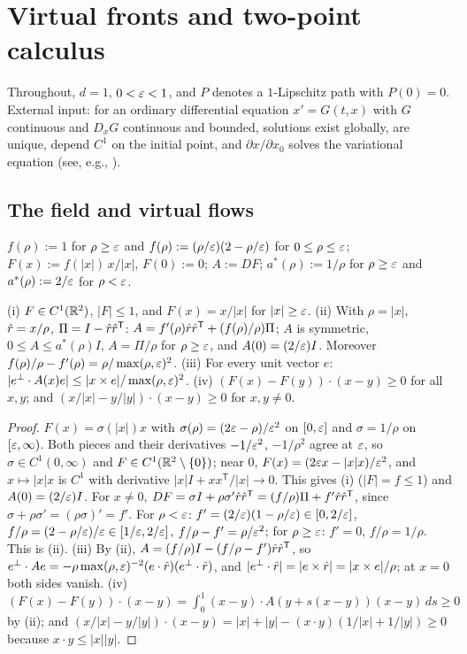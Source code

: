 \section{Virtual fronts and two-point calculus}\label{sec:prelim}

Throughout, $d=1$, $0<\varepsilon<1$, and $P$ denotes a $1$-Lipschitz path with $P(0)=0$. External input: for an ordinary
differential equation $x'=G(t,x)$ with $G$ continuous and $D_xG$ continuous and bounded, solutions exist globally, are unique,
depend $C^1$ on the initial point, and $\partial x/\partial x_0$ solves the variational equation (see, e.g.,
\cite[Ch.~V]{Hartman}).

\subsection{The field and virtual flows}

\begin{definition}\label{def:field}
$f(\rho):=1$ for $\rho\ge\varepsilon$ and $f(\rho):=(\rho/\varepsilon)(2-\rho/\varepsilon)$ for $0\le\rho\le\varepsilon$; $F(x):=f(|x|)\,x/|x|$, $F(0):=0$;
$A:=DF$; $a^*(\rho):=1/\rho$ for $\rho\ge\varepsilon$ and $a^*(\rho):=2/\varepsilon$ for $\rho<\varepsilon$.
\end{definition}

\begin{lemma}\label{lem:field}
\textup{(i)} $F\in C^1(\mathbb{R}^2)$, $|F|\le1$, and $F(x)=x/|x|$ for $|x|\ge\varepsilon$.
\textup{(ii)} With $\rho=|x|$, $\hat r=x/\rho$, $\Pi=I-\hat r\hat r^{\mathsf T}$: $A=f'(\rho)\hat r\hat r^{\mathsf T}+(f(\rho)/\rho)\Pi$;
$A$ is symmetric, $0\le A\le a^*(\rho)I$, $A=\Pi/\rho$ for $\rho\ge\varepsilon$, and $A(0)=(2/\varepsilon)I$. Moreover
$f(\rho)/\rho-f'(\rho)=\rho/\max(\rho,\varepsilon)^2$.
\textup{(iii)} For every unit vector $e$: $|e^\perp\cdot A(x)e|\le|x\times e|/\max(\rho,\varepsilon)^2$.
\textup{(iv)} $(F(x)-F(y))\cdot(x-y)\ge0$ for all $x,y$; and $(x/|x|-y/|y|)\cdot(x-y)\ge0$ for $x,y\ne0$.
\end{lemma}

\begin{proof}
$F(x)=\sigma(|x|)x$ with $\sigma(\rho)=(2\varepsilon-\rho)/\varepsilon^2$ on $[0,\varepsilon]$ and $\sigma=1/\rho$ on $[\varepsilon,\infty)$. Both pieces and
their derivatives $-1/\varepsilon^2$, $-1/\rho^2$ agree at $\varepsilon$, so $\sigma\in C^1(0,\infty)$ and $F\in C^1(\mathbb{R}^2\setminus\{0\})$; near
$0$, $F(x)=(2\varepsilon x-|x|x)/\varepsilon^2$, and $x\mapsto|x|x$ is $C^1$ with derivative $|x|I+xx^{\mathsf T}/|x|\to0$. This gives (i)
($|F|=f\le1$) and $A(0)=(2/\varepsilon)I$. For $x\ne0$, $DF=\sigma I+\rho\sigma'\hat r\hat r^{\mathsf T}=(f/\rho)\Pi+f'\hat r\hat r^{\mathsf T}$,
since $\sigma+\rho\sigma'=(\rho\sigma)'=f'$. For $\rho<\varepsilon$: $f'=(2/\varepsilon)(1-\rho/\varepsilon)\in[0,2/\varepsilon]$,
$f/\rho=(2-\rho/\varepsilon)/\varepsilon\in[1/\varepsilon,2/\varepsilon]$, $f/\rho-f'=\rho/\varepsilon^2$; for $\rho\ge\varepsilon$: $f'=0$, $f/\rho=1/\rho$. This is (ii).
(iii) By (ii), $A=(f/\rho)I-(f/\rho-f')\hat r\hat r^{\mathsf T}$, so
$e^\perp\cdot Ae=-\rho\max(\rho,\varepsilon)^{-2}(e\cdot\hat r)(e^\perp\cdot\hat r)$, and $|e^\perp\cdot\hat r|=|e\times\hat r|=|x\times e|/\rho$;
at $x=0$ both sides vanish. (iv) $(F(x)-F(y))\cdot(x-y)=\int_0^1(x-y)\cdot A(y+s(x-y))(x-y)\,ds\ge0$ by (ii); and
$(x/|x|-y/|y|)\cdot(x-y)=|x|+|y|-(x\cdot y)(1/|x|+1/|y|)\ge0$ because $x\cdot y\le|x||y|$.
\end{proof}

